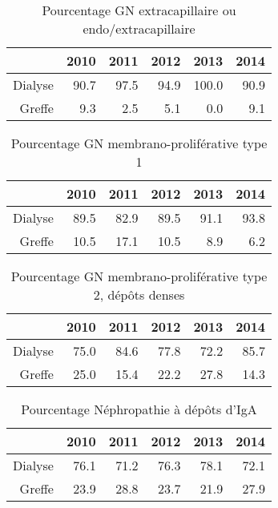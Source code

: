 \documentclass[11pt,a4paper]{article}\usepackage[]{graphicx}\usepackage[]{color}
\begin{document}
\begin{multicols}{2}
\begin{table}[H]
\centering
\begin{tabular}{rrrrrr}
  \hline
 & 2010 & 2011 & 2012 & 2013 & 2014 \\ 
  \hline
Dialyse & 90.7 & 97.5 & 94.9 & 100.0 & 90.9 \\ 
  Greffe & 9.3 & 2.5 & 5.1 & 0.0 & 9.1 \\ 
   \hline
\end{tabular}
\caption{Pourcentage GN extracapillaire ou endo/extracapillaire} 
\end{table}
\begin{table}[H]
\centering
\begin{tabular}{rrrrrr}
  \hline
 & 2010 & 2011 & 2012 & 2013 & 2014 \\ 
  \hline
Dialyse & 89.5 & 82.9 & 89.5 & 91.1 & 93.8 \\ 
  Greffe & 10.5 & 17.1 & 10.5 & 8.9 & 6.2 \\ 
   \hline
\end{tabular}
\caption{Pourcentage GN membrano-proliférative type 1} 
\end{table}
\begin{table}[H]
\centering
\begin{tabular}{rrrrrr}
  \hline
 & 2010 & 2011 & 2012 & 2013 & 2014 \\ 
  \hline
Dialyse & 75.0 & 84.6 & 77.8 & 72.2 & 85.7 \\ 
  Greffe & 25.0 & 15.4 & 22.2 & 27.8 & 14.3 \\ 
   \hline
\end{tabular}
\caption{Pourcentage GN membrano-proliférative type 2, dépôts denses} 
\end{table}
\begin{table}[H]
\centering
\begin{tabular}{rrrrrr}
  \hline
 & 2010 & 2011 & 2012 & 2013 & 2014 \\ 
  \hline
Dialyse & 76.1 & 71.2 & 76.3 & 78.1 & 72.1 \\ 
  Greffe & 23.9 & 28.8 & 23.7 & 21.9 & 27.9 \\ 
   \hline
\end{tabular}
\caption{Pourcentage Néphropathie à dépôts d'IgA} 

\end{table}
\end{multicols}
\end{document}

